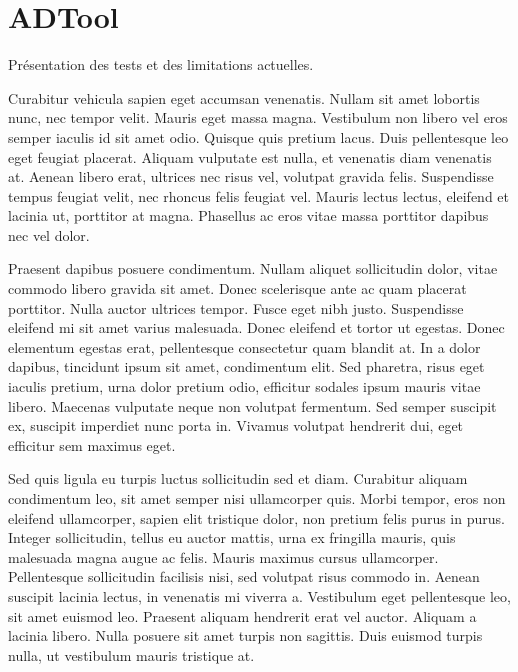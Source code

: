 \section{ADTool}
	\label{sec:adtool}

	Présentation des tests et des limitations actuelles.

	Curabitur vehicula sapien eget accumsan venenatis. Nullam sit amet lobortis nunc, nec tempor velit. Mauris eget massa magna. Vestibulum non libero vel eros semper iaculis id sit amet odio. Quisque quis pretium lacus. Duis pellentesque leo eget feugiat placerat. Aliquam vulputate est nulla, et venenatis diam venenatis at. Aenean libero erat, ultrices nec risus vel, volutpat gravida felis. Suspendisse tempus feugiat velit, nec rhoncus felis feugiat vel. Mauris lectus lectus, eleifend et lacinia ut, porttitor at magna. Phasellus ac eros vitae massa porttitor dapibus nec vel dolor.

	Praesent dapibus posuere condimentum. Nullam aliquet sollicitudin dolor, vitae commodo libero gravida sit amet. Donec scelerisque ante ac quam placerat porttitor. Nulla auctor ultrices tempor. Fusce eget nibh justo. Suspendisse eleifend mi sit amet varius malesuada. Donec eleifend et tortor ut egestas. Donec elementum egestas erat, pellentesque consectetur quam blandit at. In a dolor dapibus, tincidunt ipsum sit amet, condimentum elit. Sed pharetra, risus eget iaculis pretium, urna dolor pretium odio, efficitur sodales ipsum mauris vitae libero. Maecenas vulputate neque non volutpat fermentum. Sed semper suscipit ex, suscipit imperdiet nunc porta in. Vivamus volutpat hendrerit dui, eget efficitur sem maximus eget.

	Sed quis ligula eu turpis luctus sollicitudin sed et diam. Curabitur aliquam condimentum leo, sit amet semper nisi ullamcorper quis. Morbi tempor, eros non eleifend ullamcorper, sapien elit tristique dolor, non pretium felis purus in purus. Integer sollicitudin, tellus eu auctor mattis, urna ex fringilla mauris, quis malesuada magna augue ac felis. Mauris maximus cursus ullamcorper. Pellentesque sollicitudin facilisis nisi, sed volutpat risus commodo in. Aenean suscipit lacinia lectus, in venenatis mi viverra a. Vestibulum eget pellentesque leo, sit amet euismod leo. Praesent aliquam hendrerit erat vel auctor. Aliquam a lacinia libero. Nulla posuere sit amet turpis non sagittis. Duis euismod turpis nulla, ut vestibulum mauris tristique at. 


